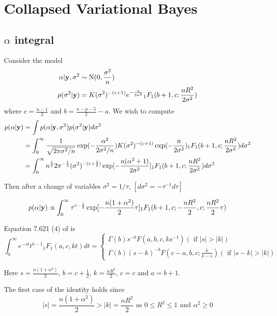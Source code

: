 \documentclass{amsart}[12pt]
\theoremstyle{definition}
\begin{document}
\section{Collapsed Variational Bayes}

\subsection{$\alpha$ integral}
Consider the model
\begin{align*}
\alpha | {\bf y}, \sigma^2 &\sim \text{N}(0, \frac{\sigma^2}{n}) \\
p(\sigma^2 | {\bf y}) &= K (\sigma^2)^{-(c+1)} e^{-\frac{n}{2 \sigma^2}} {_1} F_1(b + 1, c; \frac{n R^2}{2 \sigma^2})
\end{align*}
where $c=\frac{n-1}{2}$ and $b = \frac{n - p - 5}{2} - a$. We wish to compute
\begin{align*}
	p(\alpha | {\bf y}) &= \int p(\alpha | {\bf y}, \sigma^2) p(\sigma^2 | {\bf y}) d \sigma^2 \\
	&= \int_0^\infty \frac{1}{\sqrt{2 \pi \sigma^2 / n}} \exp(-\frac{\alpha^2}{2 \sigma^2 / n}) K (\sigma^2)^{-(c+1)} \exp (- \frac{n}{2 \sigma^2}) {_1} F_1(b+1, c; \frac{n R^2}{2 \sigma^2}) d \sigma^2 \\
	&= \int_0^\infty n^{\frac{1}{2}} 2 \pi^{-\frac{1}{2}} (\sigma^2)^{-(c + \frac{3}{2})} \exp [-\frac{n(\alpha^2 + 1)}{2 \sigma^2}] {_1} F_1(b + 1, c; \frac{n R^2}{2 \sigma^2}) d \sigma^2
\end{align*}

Then after a change of variables $\sigma^2 = 1 / \tau$, $[ d \sigma^2 = - \tau^{-1} d \tau]$

\[
	p(\alpha | {\bf y}) \propto \int_0^\infty \tau^{c - \frac{1}{2}} \exp [-\frac{n(1 + \alpha^2)}{2} \tau] {_1} F_1(b + 1, c; -\frac{n R^2}{2}, c; \frac{n R^2}{2} \tau)
\]

Equation 7.621 (4) of \citep{Gradshteyn1988} is
\[
	\int_0^\infty e^{-st} t^{b-1} {_1} F_1(a, c, kt) dt =
	\begin{cases}
		\Gamma(b) s^{-b} F(a, b, c, ks^{-1}) (\text{ if } |s| > |k|) \\
		\Gamma(b) (s - k)^{-b} F(c - a, b, c; \frac{k}{k - s}) (\text{ if } |s - k| > |k|)
	\end{cases}
\]

Here $s = \frac{n(1 + \alpha^2)}{2}$, $b = c + \frac{1}{2}$, $k = \frac{n R^2}{2}$, $c = c$ and $a = b + 1$.

The first case of the identity holds since
\[
	|s| = \frac{n(1 + \alpha^2)}{2} > |k| = \frac{n R^2}{2} \text{ as } 0 \leq R^2 \leq 1 \text{ and } \alpha^2 \geq 0
\]
\end{document}
